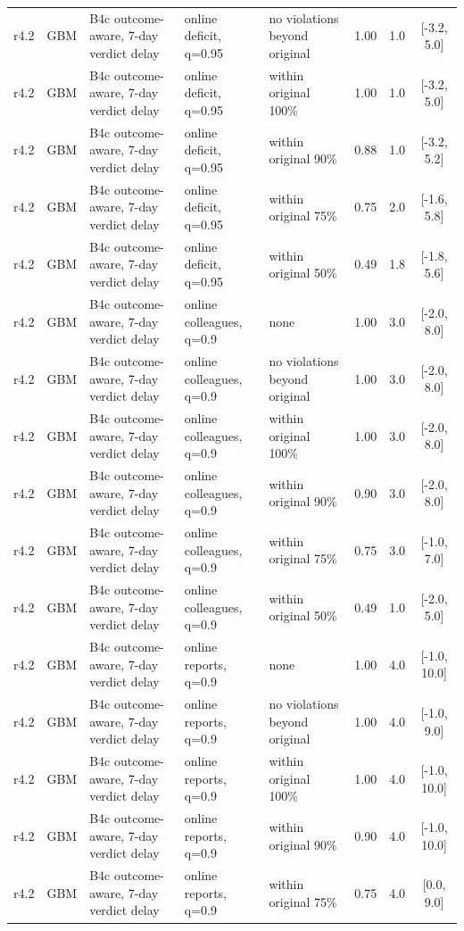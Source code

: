 \begin{longtable}{lllp{4.2cm}p{3.4cm}ccc}
r4.2 & GBM & B4c outcome-aware, 7-day verdict delay & online deficit, q=0.95 & no violations beyond original & 1.00 & 1.0 & [-3.2, 5.0] \\
r4.2 & GBM & B4c outcome-aware, 7-day verdict delay & online deficit, q=0.95 & within original 100\% & 1.00 & 1.0 & [-3.2, 5.0] \\
r4.2 & GBM & B4c outcome-aware, 7-day verdict delay & online deficit, q=0.95 & within original 90\% & 0.88 & 1.0 & [-3.2, 5.2] \\
r4.2 & GBM & B4c outcome-aware, 7-day verdict delay & online deficit, q=0.95 & within original 75\% & 0.75 & 2.0 & [-1.6, 5.8] \\
r4.2 & GBM & B4c outcome-aware, 7-day verdict delay & online deficit, q=0.95 & within original 50\% & 0.49 & 1.8 & [-1.8, 5.6] \\
r4.2 & GBM & B4c outcome-aware, 7-day verdict delay & online colleagues, q=0.9 & none & 1.00 & 3.0 & [-2.0, 8.0] \\
r4.2 & GBM & B4c outcome-aware, 7-day verdict delay & online colleagues, q=0.9 & no violations beyond original & 1.00 & 3.0 & [-2.0, 8.0] \\
r4.2 & GBM & B4c outcome-aware, 7-day verdict delay & online colleagues, q=0.9 & within original 100\% & 1.00 & 3.0 & [-2.0, 8.0] \\
r4.2 & GBM & B4c outcome-aware, 7-day verdict delay & online colleagues, q=0.9 & within original 90\% & 0.90 & 3.0 & [-2.0, 8.0] \\
r4.2 & GBM & B4c outcome-aware, 7-day verdict delay & online colleagues, q=0.9 & within original 75\% & 0.75 & 3.0 & [-1.0, 7.0] \\
r4.2 & GBM & B4c outcome-aware, 7-day verdict delay & online colleagues, q=0.9 & within original 50\% & 0.49 & 1.0 & [-2.0, 5.0] \\
r4.2 & GBM & B4c outcome-aware, 7-day verdict delay & online reports, q=0.9 & none & 1.00 & 4.0 & [-1.0, 10.0] \\
r4.2 & GBM & B4c outcome-aware, 7-day verdict delay & online reports, q=0.9 & no violations beyond original & 1.00 & 4.0 & [-1.0, 9.0] \\
r4.2 & GBM & B4c outcome-aware, 7-day verdict delay & online reports, q=0.9 & within original 100\% & 1.00 & 4.0 & [-1.0, 10.0] \\
r4.2 & GBM & B4c outcome-aware, 7-day verdict delay & online reports, q=0.9 & within original 90\% & 0.90 & 4.0 & [-1.0, 10.0] \\
r4.2 & GBM & B4c outcome-aware, 7-day verdict delay & online reports, q=0.9 & within original 75\% & 0.75 & 4.0 & [0.0, 9.0] \\

\end{longtable}
